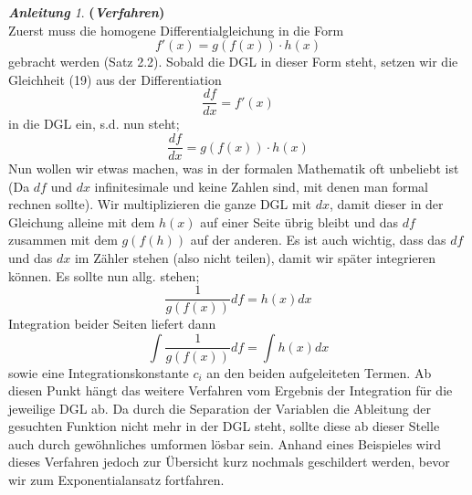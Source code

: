 \documentclass[a4paper,11pt]{article}
\theoremstyle{remark}
\newtheorem{guide}{\textbf{Anleitung}}[section]
\begin{document}
\begin{guide}{\textbf{(\textit{Verfahren})}} \\
Zuerst muss die homogene Differentialgleichung in die Form 
\begin{equation}
f'(x)=g(f(x))\cdot h(x)
\end{equation}
gebracht werden (Satz 2.2). Sobald die DGL in dieser Form steht, setzen wir die Gleichheit (19) aus der Differentiation 
\begin{equation}
\frac{df}{dx}=f'(x)
\end{equation}
in die DGL ein, s.d. nun steht;
\begin{equation}
\frac{df}{dx}=g(f(x))\cdot h(x)
\end{equation}
Nun wollen wir etwas machen, was in der formalen Mathematik oft unbeliebt ist (Da $df$ und $dx$ infinitesimale und keine Zahlen sind, mit denen man formal rechnen sollte). Wir multiplizieren die ganze DGL mit $dx$, damit dieser in der Gleichung alleine mit dem $h(x)$ auf einer Seite übrig bleibt und das $df$ zusammen mit dem $g(f(h))$ auf der anderen. Es ist auch wichtig, dass das $df$ und das $dx$ im Zähler stehen (also nicht teilen), damit wir später integrieren können. Es sollte nun allg. stehen;
\begin{equation}
\frac{1}{g(f(x))}df=h(x)dx
\end{equation}
Integration beider Seiten liefert dann
\begin{equation}
\int \frac{1}{g(f(x))}df= \int h(x)dx
\end{equation}
sowie eine Integrationskonstante $c_i$ an den beiden aufgeleiteten Termen. Ab diesen Punkt hängt das weitere Verfahren vom Ergebnis der Integration für die jeweilige DGL ab. Da durch die Separation der Variablen die Ableitung der gesuchten Funktion nicht mehr in der DGL steht, sollte diese ab dieser Stelle auch durch gewöhnliches umformen lösbar sein. Anhand eines Beispieles wird dieses Verfahren jedoch zur Übersicht kurz nochmals geschildert werden, bevor wir zum Exponentialansatz fortfahren. 
\end{guide}
\vspace{0,5cm}
\end{document}

